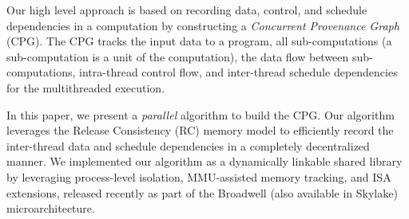 


Our high level approach is based on recording data, control, and schedule dependencies in a computation by constructing a {\em Concurrent Provenance Graph} (CPG). The CPG tracks the input data to a program, all sub-computations (a sub-computation is a unit of the computation), the data flow between sub-computations, intra-thread control flow, and inter-thread schedule dependencies for the multithreaded execution. 


In this paper, we present a {\em parallel} algorithm to build the CPG. Our algorithm leverages the Release Consistency (RC) memory model to efficiently record the inter-thread data and schedule dependencies in a completely decentralized manner. We implemented our algorithm as a dynamically linkable shared library by leveraging process-level isolation, MMU-assisted memory tracking, and \intelpt ISA extensions, released recently as part of the Broadwell (also available in Skylake) microarchitecture. 



